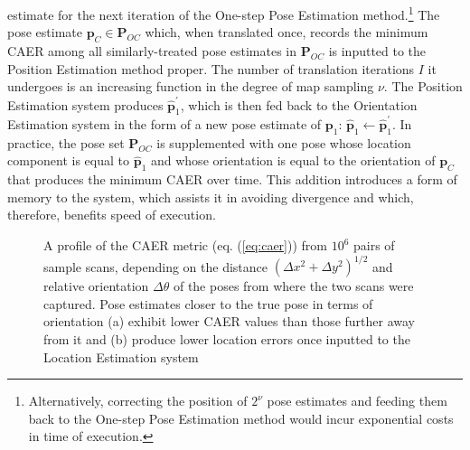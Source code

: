 estimate for the next iteration of the One-step Pose Estimation
method.\footnote{Alternatively, correcting the position of $2^\nu$ pose
estimates and feeding them back to the One-step Pose Estimation method would
incur exponential costs in time of execution.} The pose estimate $\bm{p}_C \in
\bm{P}_{OC}$ which, when translated once, records the minimum CAER among all
similarly-treated pose estimates in $\bm{P}_{OC}$ is inputted to the Position
Estimation method proper. The number of translation iterations $I$ it undergoes
is an increasing function in the degree of map sampling $\nu$.
The Position Estimation system produces $\hat{\bm{p}}_1^\prime$, which is then
fed back to the Orientation Estimation system in the form of a new pose
estimate of $\bm{p}_1$: $\hat{\bm{p}}_1 \leftarrow \hat{\bm{p}}_1^\prime$. In
practice, the pose set $\bm{P}_{OC}$ is supplemented with one pose whose
location component is equal to $\hat{\bm{p}}_1$ and whose orientation is equal
to the orientation of $\bm{p}_C$ that produces the minimum CAER over time. This
addition introduces a form of memory to the system, which assists it in
avoiding divergence and which, therefore, benefits speed of execution.

\begin{figure}[]\hspace{1cm}
  
  \vspace{1cm}
  \caption{\small A profile of the CAER metric (eq. (\ref{eq:caer})) from
           $10^6$ pairs of sample scans, depending on the distance
           $(\Delta x^2 + \Delta y^2)^{1/2}$ and relative orientation
           $\Delta \theta$ of the poses from where the two scans were captured.
           Pose estimates closer to the true pose in terms of orientation
           (a) exhibit lower CAER values than those further away from it and (b)
           produce lower location errors once inputted to the Location
           Estimation system}
  \label{fig:caer}
\end{figure}

